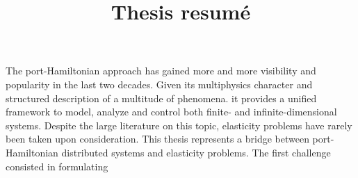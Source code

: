 \documentclass{article}
\title{Thesis resumé}
\begin{document}
\maketitle
The port-Hamiltonian approach has gained more and more visibility and popularity in the last two decades. Given its multiphysics character and structured description of a multitude of phenomena. it provides a unified framework to model, analyze and control both finite- and infinite-dimensional systems. Despite the large literature on this topic, elasticity problems have rarely been taken upon consideration. This thesis represents a bridge between port-Hamiltonian distributed systems and elasticity problems. The first challenge consisted in formulating
\end{document}
